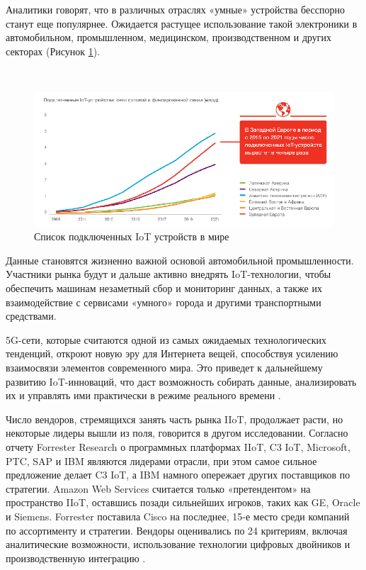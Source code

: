 Аналитики говорят, что в различных отраслях «умные» устройства бесспорно станут еще популярнее. Ожидается растущее использование такой электроники в автомобильном, промышленном, медицинском, производственном и других секторах (Рисунок \ref{fig:analysis:forecast:deviceDiagram}).

~
\begin{figure}[H]
\centering
	\includegraphics[scale=0.8]{figures/forrester.png}
	\caption{Список подключенных IoT устройств в мире}
	\label{fig:analysis:forecast:deviceDiagram}
\end{figure}

Данные становятся жизненно важной основой автомобильной промышленности. Участники рынка будут и дальше активно внедрять IoT-технологии, чтобы обеспечить машинам незаметный сбор и мониторинг данных, а также их взаимодействие с сервисами «умного» города и другими транспортными средствами.

5G-сети, которые считаются одной из самых ожидаемых технологических тенденций, откроют новую эру для Интернета вещей, способствуя усилению взаимосвязи элементов современного мира. Это приведет к дальнейшему развитию IoT-инноваций, что даст возможность собирать данные, анализировать их и управлять ими практически в режиме реального времени \cite{iot_data_2019}.

Число вендоров, стремящихся занять часть рынка IIoT, продолжает расти, но некоторые лидеры вышли из поля, говорится в другом исследовании. Согласно отчету Forrester Research о программных платформах IIoT, C3 IoT, Microsoft, PTC, SAP и IBM являются лидерами отрасли, при этом самое сильное предложение делает C3 IoT, а IBM намного опережает других поставщиков по стратегии. Amazon Web Services считается только «претендентом» на пространство IIoT, оставшись позади сильнейших игроков, таких как GE, Oracle и Siemens. Forrester поставила Cisco на последнее, 15-е место среди компаний по ассортименту и стратегии. Вендоры оценивались по 24 критериям, включая аналитические возможности, использование технологии цифровых двойников и производственную интеграцию \cite{iot_data_2019}.

